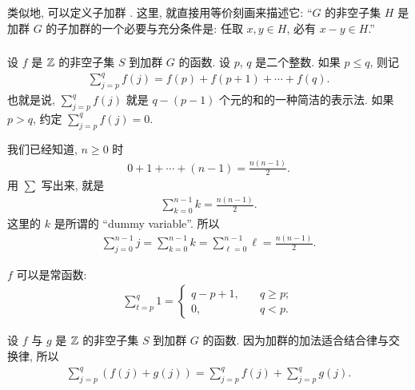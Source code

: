 \begin{remark}
    类似地, 可以定义子加群 . 这里, 就直接用等价刻画来描述它: ``$G$ 的非空子集 $H$ 是加群 $G$ 的子加群的一个必要与充分条件是: 任取 $x,y \in H$, 必有 $x-y \in H$.''
\end{remark}

\subsubsection*{\Sums}

\begin{definition}
    设 $f$ 是 $\mathbb{Z}$ 的非空子集 $S$ 到加群 $G$ 的函数. 设 $p$, $q$ 是二个整数. 如果 $p \leq q$, 则记
    \begin{align*}
        \sum_{j = p}^{q} f(j) = f(p) + f(p + 1) + \cdots + f(q).
    \end{align*}
    也就是说, $\sum_{j = p}^{q} f(j)$ 就是 $q - (p - 1)$ 个元的和的一种简洁的表示法. 如果 $p > q$, 约定 $\sum_{j = p}^{q} f(j) = 0$.
\end{definition}

\begin{example}
    我们已经知道, $n \geq 0$ 时
    \begin{align*}
        0 + 1 + \cdots + (n-1) = \frac{n(n-1)}{2}.
    \end{align*}
    用 $\sum$ 写出来, 就是
    \begin{align*}
        \sum_{k=0}^{n-1} k = \frac{n(n-1)}{2}.
    \end{align*}
    这里的 $k$ 是所谓的 ``dummy variable''. 所以
    \begin{align*}
        \sum_{j=0}^{n-1} j = \sum_{k=0}^{n-1} k = \sum_{\ell=0}^{n-1} \ell = \frac{n(n-1)}{2}.
    \end{align*}
\end{example}

\begin{example}
    $f$ 可以是常函数:
    \begin{align*}
        \sum_{t=p}^{q} 1 = \begin{cases}
            q - p + 1, & \quad q \geq p; \\
            0,         & \quad q < p.
        \end{cases}
    \end{align*}
\end{example}

\begin{example}
    设 $f$ 与 $g$ 是 $\mathbb{Z}$ 的非空子集 $S$ 到加群 $G$ 的函数. 因为加群的加法适合结合律与交换律, 所以
    \begin{align*}
        \sum_{j=p}^{q} (f(j) + g(j)) = \sum_{j=p}^{q} f(j) + \sum_{j=p}^{q} g(j).
    \end{align*}
\end{example}

